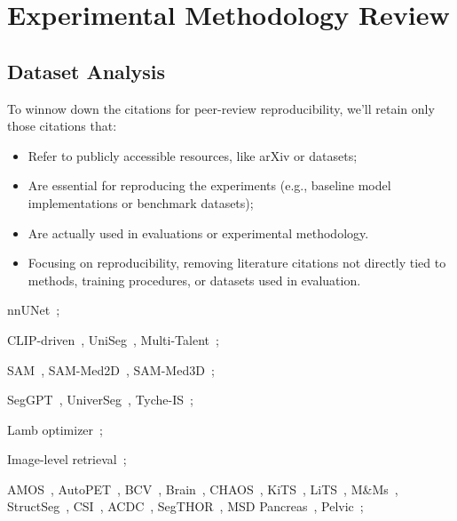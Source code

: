 \section{Experimental Methodology Review}
\label{sec:experimental_methodology}

\subsection{Dataset Analysis}
To winnow down the citations for peer-review reproducibility, we'll retain only those citations that:
\begin{itemize}
\item    Refer to publicly accessible resources, like arXiv or datasets;

  \item  Are essential for reproducing the experiments (e.g., baseline model implementations or benchmark datasets);

\item    Are actually used in evaluations or experimental methodology.

\item Focusing on reproducibility, removing literature citations not directly tied to methods, training procedures, or datasets used in evaluation.

\end{itemize}
nnUNet~\cite{isensee2021nnu};

CLIP-driven~\cite{liu2023clipdriven},
UniSeg~\cite{ye2023uniseg},
Multi-Talent~\cite{ulrich2023multitalent};

SAM~\cite{kirillov2023segmentanything},
SAM-Med2D~\cite{cheng2023sammed2d},
SAM-Med3D~\cite{wang2024sammed3d};

SegGPT~\cite{wang2023seggpt},
UniverSeg~\cite{butoi2023universeg},
Tyche-IS~\cite{rakic2024tyche};

Lamb optimizer~\cite{you2019large};

Image-level retrieval~\cite{zhang2023makes};

AMOS~\cite{ji2022amos},
AutoPET~\cite{gatidis2022autopet},
BCV~\cite{bcv},
Brain~\cite{rodrigue2022brain},
CHAOS~\cite{CHAOS2021},
KiTS~\cite{heller2019kits19},
LiTS~\cite{bilic2019liver},
M\&Ms~\cite{campello2021mnm},
StructSeg~\cite{structseg},
CSI~\cite{guoyan2018csi},
ACDC~\cite{bernard2018acdc},
SegTHOR~\cite{lambert2020segthor},
MSD Pancreas~\cite{antonelli2022msd},
Pelvic~\cite{liu2021pelvic};

